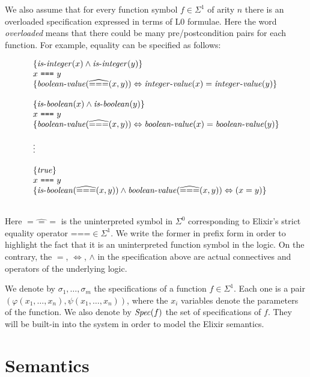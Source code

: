 We also assume that for every function symbol $f \in \Sigma^{1}$ of arity $n$
there is an overloaded specification expressed in terms of L0 formulae. Here the
word \emph{overloaded} means that there could be many pre/postcondition pairs
for each function. For example, equality can be specified as follows:

\[
\begin{array}{l}
\{ \mathit{is\mbox{-}integer}(x) \wedge \mathit{is\mbox{-}integer}(y) \}\\
x~\texttt{===}~y\\
\{ \mathit{boolean\mbox{-}value}(\widehat{===}(x, y)) \Leftrightarrow \mathit{integer\mbox{-}value}(x) = \mathit{integer\mbox{-}value}(y) \}\\
\\
\{ \mathit{is\mbox{-}boolean}(x) \wedge \mathit{is\mbox{-}boolean}(y) \}\\
x~\texttt{===}~y\\
\{ \mathit{boolean\mbox{-}value}(\widehat{===}(x, y)) \Leftrightarrow \mathit{boolean\mbox{-}value}(x) = \mathit{boolean\mbox{-}value}(y) \}\\
\\
\vdots
\\
\\
\{\mathit{true}\}\\
x~\texttt{===}~y\\
\{ \mathit{is\mbox{-}boolean}(\widehat{===}(x, y)) \wedge \mathit{boolean\mbox{-}value}(\widehat{===}(x, y)) \Leftrightarrow (x = y) \}\\
\\
\end{array}
\]

Here $\widehat{===}$ is the uninterpreted symbol in $\Sigma^{0}$ corresponding 
to Elixir's strict equality operator $\texttt{===} \in \Sigma^{1}$. We write the
former in prefix form in order to highlight the fact that it is an uninterpreted
function symbol in the logic. On the contrary, the $=$, $\Leftrightarrow$,
$\wedge$ in the specification above are actual connectives and operators of the
underlying logic.

We denote by $\sigma_1, \ldots, \sigma_m$ the specifications of a function $f
\in \Sigma^{1}$. Each one is a pair $(\varphi(x_1, \ldots, x_n), \psi(x_1,
\ldots, x_n))$, where the $x_i$ variables denote the parameters of the function.
We also denote by $\mathit{Spec}(f)$ the set of specifications of $f$. They will be
built-in into the system in order to model the Elixir semantics.

\section{Semantics}

